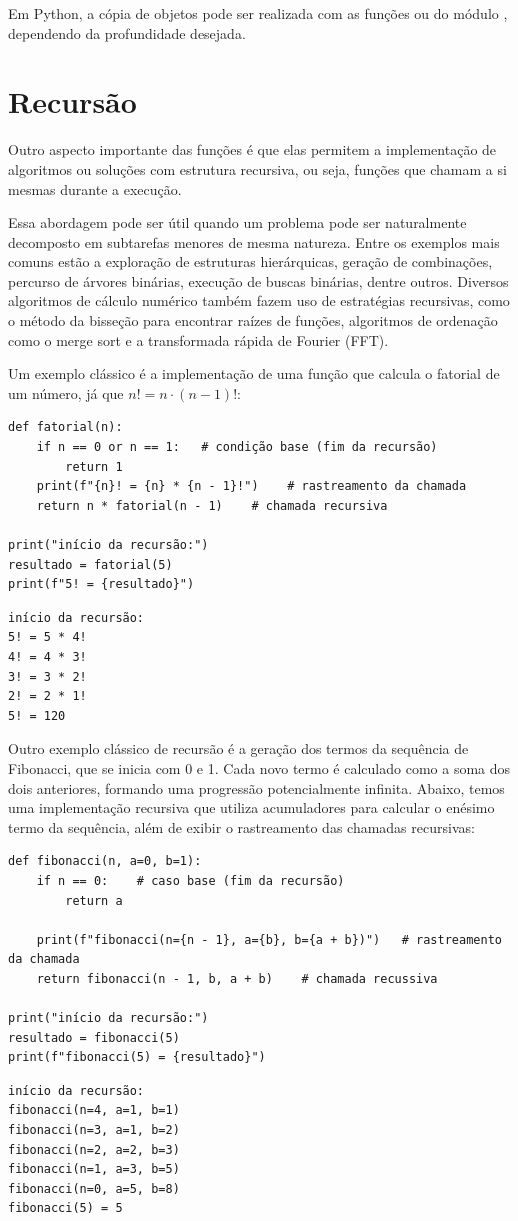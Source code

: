 Em Python, a cópia de objetos pode ser realizada com as funções  ou  do módulo
, dependendo da profundidade desejada.



\section{Recursão}

Outro aspecto importante das funções é que elas permitem a implementação de algoritmos ou soluções com estrutura
recursiva, ou seja, funções que chamam a si mesmas durante a execução.

Essa abordagem pode ser útil quando um problema pode ser naturalmente decomposto em subtarefas menores de mesma
natureza.
Entre os exemplos mais comuns estão a exploração de estruturas hierárquicas, geração de combinações, percurso de
árvores binárias, execução de buscas binárias, dentre outros.
Diversos algoritmos de cálculo numérico também fazem uso de estratégias recursivas, como o método da bisseção para
encontrar raízes de funções, algoritmos de ordenação como o merge sort e a transformada rápida de Fourier (FFT).

Um exemplo clássico é a implementação de uma função que calcula o fatorial de um número, já que $n! = n \cdot (n-1)!$:
\begin{verbatim}
def fatorial(n):
    if n == 0 or n == 1:   # condição base (fim da recursão)
        return 1
    print(f"{n}! = {n} * {n - 1}!")    # rastreamento da chamada
    return n * fatorial(n - 1)    # chamada recursiva

print("início da recursão:")
resultado = fatorial(5)
print(f"5! = {resultado}")
\end{verbatim}
\begin{verbatim}
início da recursão:
5! = 5 * 4!
4! = 4 * 3!
3! = 3 * 2!
2! = 2 * 1!
5! = 120
\end{verbatim}

Outro exemplo clássico de recursão é a geração dos termos da sequência de Fibonacci, que se inicia com 0 e 1.
Cada novo termo é calculado como a soma dos dois anteriores, formando uma progressão potencialmente infinita.
Abaixo, temos uma implementação recursiva que utiliza acumuladores para calcular o enésimo termo da sequência,
além de exibir o rastreamento das chamadas recursivas:
\begin{verbatim}
def fibonacci(n, a=0, b=1):
    if n == 0:    # caso base (fim da recursão)
        return a

    print(f"fibonacci(n={n - 1}, a={b}, b={a + b})")   # rastreamento da chamada
    return fibonacci(n - 1, b, a + b)    # chamada recussiva

print("início da recursão:")
resultado = fibonacci(5)
print(f"fibonacci(5) = {resultado}")
\end{verbatim}
\begin{verbatim}
início da recursão:
fibonacci(n=4, a=1, b=1)
fibonacci(n=3, a=1, b=2)
fibonacci(n=2, a=2, b=3)
fibonacci(n=1, a=3, b=5)
fibonacci(n=0, a=5, b=8)
fibonacci(5) = 5
\end{verbatim}

